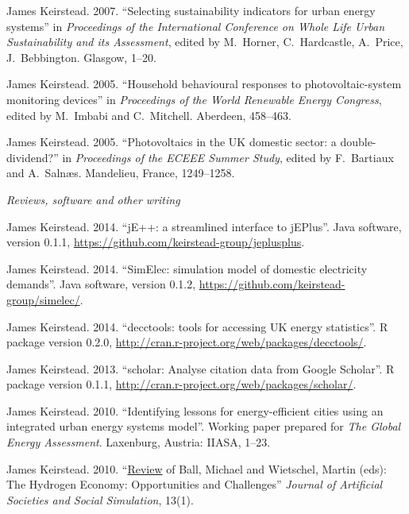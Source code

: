 \documentclass[11pt,a4paper]{article}
\begin{document}
\ind James Keirstead. 2007. ``Selecting sustainability indicators for urban energy systems'' in \emph{Proceedings of the International Conference on Whole Life Urban Sustainability and its Assessment}, edited by M.\ Horner, C.\ 
Hardcastle, A.\ Price, J.\ Bebbington. Glasgow, 1--20.

\ind James Keirstead. 2005. ``Household behavioural responses to photovoltaic-system monitoring devices'' in \emph{Proceedings of the World Renewable Energy Congress}, edited by M.\ Imbabi and C.\ Mitchell. Aberdeen, 458--463.

\ind James Keirstead. 2005. ``Photovoltaics in the UK domestic sector: a double-dividend?'' in \emph{Proceedings of the ECEEE Summer Study}, edited by F.\ Bartiaux and A.\ Saln{\ae}s. Mandelieu, France, 1249--1258.

\bigskip
 
\noindent\emph{Reviews, software and other writing \vspace{0.05in}}


\ind James Keirstead. 2014. ``jE++: a streamlined interface to jEPlus''. Java software, version 0.1.1, \url{https://github.com/keirstead-group/jeplusplus}.

\ind James Keirstead. 2014. ``SimElec: simulation model of domestic electricity demands''. Java software, version 0.1.2, \url{https://github.com/keirstead-group/simelec/}.

\ind James Keirstead. 2014. ``decctools: tools for accessing UK energy statistics''. R package version 0.2.0, \url{http://cran.r-project.org/web/packages/decctools/}.

\ind James Keirstead. 2013. ``scholar: Analyse citation data from Google Scholar''. R package version 0.1.1, \url{http://cran.r-project.org/web/packages/scholar/}.

\ind James Keirstead. 2010. ``Identifying lessons for energy-efficient cities using an integrated urban energy systems model''.  Working paper prepared for \emph{The Global Energy Assessment}.  Laxenburg, Austria: IIASA, 1--23.

\ind James Keirstead. 2010. ``\href{http://jasss.soc.surrey.ac.uk/13/1/reviews/keirstead.html}{Review} of Ball, Michael and Wietschel, Martin (eds): The Hydrogen Economy: Opportunities and Challenges'' \emph{Journal of Artificial Societies and Social Simulation}, 13(1).
\end{document}

